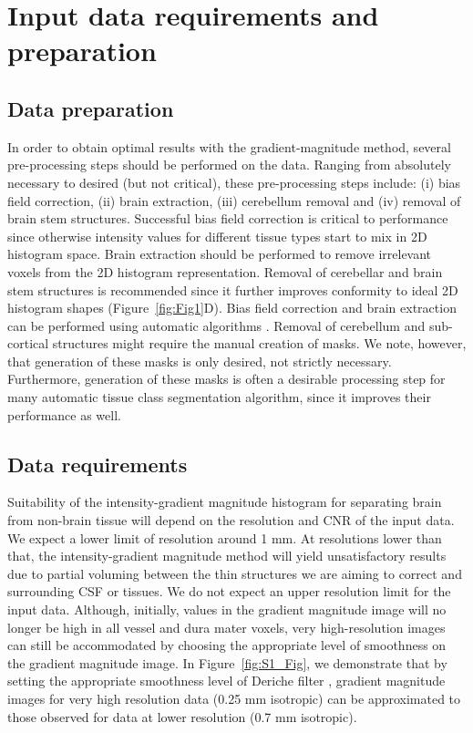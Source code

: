 \section{Input data requirements and preparation}
\label{sec:DataRequirements}
\subsection{Data preparation}
In order to obtain optimal results with the gradient-magnitude method, several pre-processing steps should be performed on the data. Ranging from absolutely necessary to desired (but not critical), these pre-processing steps include: (i) bias field correction, (ii) brain extraction, (iii) cerebellum removal and (iv) removal of brain stem structures. Successful bias field correction is critical to performance since otherwise intensity values for different tissue types start to mix in 2D histogram space. Brain extraction should be performed to remove irrelevant voxels from the 2D histogram representation. Removal of cerebellar and brain stem structures is recommended since it further improves conformity to ideal 2D histogram shapes (Figure~\ref{fig:Fig1}D). Bias field correction and brain extraction can be performed using automatic algorithms \parencite{Smith2002, Ashburner2005}. Removal of cerebellum and sub-cortical structures might require the manual creation of masks. We note, however, that generation of these masks is only desired, not strictly necessary. Furthermore, generation of these masks is often a desirable processing step for many automatic tissue class segmentation algorithm, since it improves their performance as well.

\subsection{Data requirements}
Suitability of the intensity-gradient magnitude histogram for separating brain from non-brain tissue will depend on the resolution and CNR of the input data. We expect a lower limit of resolution around 1 mm. At resolutions lower than that, the intensity-gradient magnitude method will yield unsatisfactory results due to partial voluming between the thin structures we are aiming to correct and surrounding CSF or tissues. We do not expect an upper resolution limit for the input data. Although, initially, values in the gradient magnitude image will no longer be high in all vessel and dura mater voxels, very high-resolution images can still be accommodated by choosing the appropriate level of smoothness on the gradient magnitude image. In Figure~\ref{fig:S1_Fig}, we demonstrate that by setting the appropriate smoothness level of Deriche filter \parencite{Deriche1987}, gradient magnitude images for very high resolution data (0.25 mm isotropic) \parencite{250micron_data, Lusebrink2017} can be approximated to those observed for data at lower resolution (0.7 mm isotropic).

